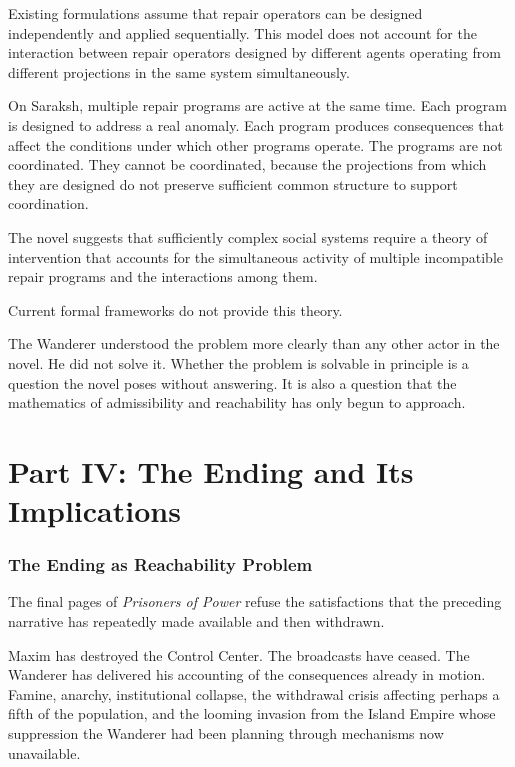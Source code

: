 \documentclass[12pt, a4paper]{article}
\theoremstyle{plain}
\theoremstyle{definition}
\theoremstyle{remark}
\begin{document}
Existing formulations assume that repair operators
can be designed independently and applied
sequentially. This model does not account for the
interaction between repair operators designed by
different agents operating from different
projections in the same system simultaneously.

On Saraksh, multiple repair programs are active
at the same time. Each program is designed to
address a real anomaly. Each program produces
consequences that affect the conditions under
which other programs operate. The programs are
not coordinated. They cannot be coordinated,
because the projections from which they are
designed do not preserve sufficient common
structure to support coordination.

The novel suggests that sufficiently complex
social systems require a theory of intervention
that accounts for the simultaneous activity of
multiple incompatible repair programs and the
interactions among them.

Current formal frameworks do not provide this theory.

The Wanderer understood the problem more clearly
than any other actor in the novel. He did not
solve it. Whether the problem is solvable in
principle is a question the novel poses without
answering. It is also a question that the
mathematics of admissibility and reachability
has only begun to approach.

\newpage
\part*{Part IV: The Ending and Its Implications}

\section{The Ending as Reachability Problem}

The final pages of \textit{Prisoners of Power}
refuse the satisfactions that the preceding
narrative has repeatedly made available and
then withdrawn.

Maxim has destroyed the Control Center. The
broadcasts have ceased. The Wanderer has delivered
his accounting of the consequences already in
motion. Famine, anarchy, institutional collapse,
the withdrawal crisis affecting perhaps a fifth
of the population, and the looming invasion from
the Island Empire whose suppression the Wanderer
had been planning through mechanisms now unavailable.
\end{document}
